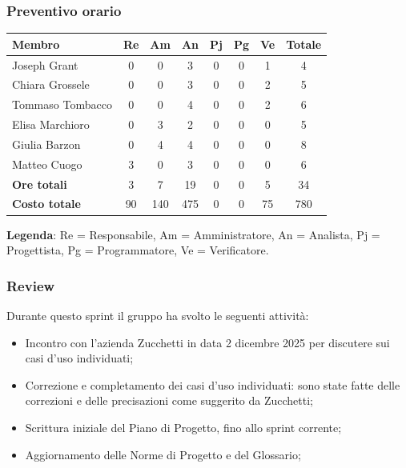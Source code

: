 \documentclass[11pt,a4paper]{article}
\begin{document}
\subsubsection{Preventivo orario}
\begin{center}
    \begin{tabular}{|l|c|c|c|c|c|c|c|}
        \hline
        \textbf{Membro} & \textbf{Re} & \textbf{Am} & \textbf{An} & \textbf{Pj} & \textbf{Pg} & \textbf{Ve} & \textbf{Totale} \\
        \hline
        Joseph Grant & 0 & 0 & 3 & 0 & 0 & 1 & 4 \\
        \hline
        Chiara Grossele & 0 & 0 & 3 & 0 & 0 & 2 & 5 \\
        \hline
        Tommaso Tombacco & 0 & 0 & 4 & 0 & 0 & 2 & 6 \\
        \hline
        Elisa Marchioro & 0 & 3 & 2 & 0 & 0 & 0 & 5 \\
        \hline
        Giulia Barzon & 0 & 4 & 4 & 0 & 0 & 0 & 8 \\
        \hline
        Matteo Cuogo & 3 & 0 & 3 & 0 & 0 & 0 & 6 \\
        \hline
        \textbf{Ore totali} & 3 & 7 & 19 & 0 & 0 & 5 & 34 \\
        \hline
        \textbf{Costo totale} & 90 & 140 & 475 & 0 & 0 & 75 & 780 \\
        \hline
    \end{tabular}
\end{center}

\noindent \textbf{Legenda}: Re = Responsabile, Am = Amministratore, An = Analista, Pj = Progettista, Pg = Programmatore, Ve = Verificatore.

\subsubsection{Review}
Durante questo sprint il gruppo ha svolto le seguenti attività:
 \begin{itemize}
        \item Incontro con l'azienda Zucchetti in data 2 dicembre 2025 per discutere sui casi d'uso individuati;
        \item Correzione e completamento dei casi d'uso individuati: sono state fatte delle correzioni e delle precisazioni come suggerito da Zucchetti;
        \item Scrittura iniziale del Piano di Progetto, fino allo sprint corrente;
        \item Aggiornamento delle Norme di Progetto e del Glossario;
    \end{itemize}
\end{document}
